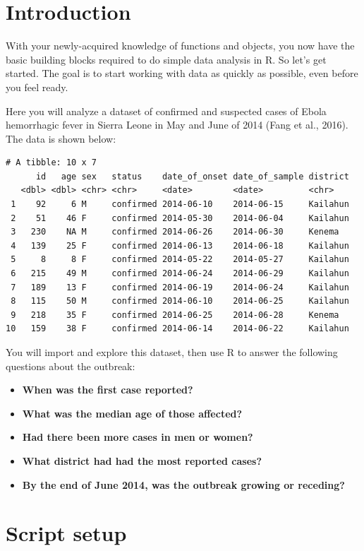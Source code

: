 \documentclass[
  letterpaper,
  DIV=11,
  numbers=noendperiod]{scrreprt}
\providecommand{\tightlist}{%
  \setlength{\itemsep}{0pt}\setlength{\parskip}{0pt}}\usepackage{longtable,booktabs,array}
\begin{document}
\section{Introduction}\label{introduction-4}

With your newly-acquired knowledge of functions and objects, you now
have the basic building blocks required to do simple data analysis in R.
So let's get started. The goal is to start working with data as quickly
as possible, even before you feel ready.

Here you will analyze a dataset of confirmed and suspected cases of
Ebola hemorrhagic fever in Sierra Leone in May and June of 2014 (Fang et
al., 2016). The data is shown below:

\begin{verbatim}
# A tibble: 10 x 7
      id   age sex   status    date_of_onset date_of_sample district
   <dbl> <dbl> <chr> <chr>     <date>        <date>         <chr>   
 1    92     6 M     confirmed 2014-06-10    2014-06-15     Kailahun
 2    51    46 F     confirmed 2014-05-30    2014-06-04     Kailahun
 3   230    NA M     confirmed 2014-06-26    2014-06-30     Kenema  
 4   139    25 F     confirmed 2014-06-13    2014-06-18     Kailahun
 5     8     8 F     confirmed 2014-05-22    2014-05-27     Kailahun
 6   215    49 M     confirmed 2014-06-24    2014-06-29     Kailahun
 7   189    13 F     confirmed 2014-06-19    2014-06-24     Kailahun
 8   115    50 M     confirmed 2014-06-10    2014-06-25     Kailahun
 9   218    35 F     confirmed 2014-06-25    2014-06-28     Kenema  
10   159    38 F     confirmed 2014-06-14    2014-06-22     Kailahun
\end{verbatim}

You will import and explore this dataset, then use R to answer the
following questions about the outbreak:

\begin{itemize}
\tightlist
\item
  \textbf{When was the first case reported?}
\item
  \textbf{What was the median age of those affected?}
\item
  \textbf{Had there been more cases in men or women?}
\item
  \textbf{What district had had the most reported cases?}
\item
  \textbf{By the end of June 2014, was the outbreak growing or
  receding?}
\end{itemize}

\section{Script setup}\label{script-setup}
\end{document}
